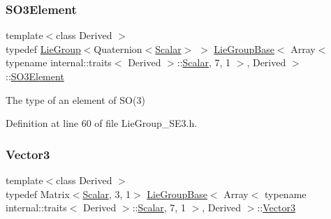 \subsubsection{\texorpdfstring{S\+O3\+Element}{SO3Element}}
{\footnotesize\ttfamily template$<$class Derived $>$ \\
typedef \hyperlink{class_lie_group}{Lie\+Group}$<$Quaternion$<$\hyperlink{class_lie_group_base_3_01_array_3_01typename_01internal_1_1traits_3_01_derived_01_4_1_1_scalar_0d6d4b5459662fc32c7117aee50362fb1_a831695c575380c9a1df32eff9fc4a8c6}{Scalar}$>$ $>$ \hyperlink{class_lie_group_base}{Lie\+Group\+Base}$<$ Array$<$ typename internal\+::traits$<$ Derived $>$\+::\hyperlink{class_lie_group_base_3_01_array_3_01typename_01internal_1_1traits_3_01_derived_01_4_1_1_scalar_0d6d4b5459662fc32c7117aee50362fb1_a831695c575380c9a1df32eff9fc4a8c6}{Scalar}, 7, 1 $>$, Derived $>$\+::\hyperlink{class_lie_group_base_3_01_array_3_01typename_01internal_1_1traits_3_01_derived_01_4_1_1_scalar_0d6d4b5459662fc32c7117aee50362fb1_a2594349e8f4329af620dff380a457890}{S\+O3\+Element}}

The type of an element of S\+O(3) 

Definition at line 60 of file Lie\+Group\+\_\+\+S\+E3.\+h.

\hypertarget{class_lie_group_base_3_01_array_3_01typename_01internal_1_1traits_3_01_derived_01_4_1_1_scalar_0d6d4b5459662fc32c7117aee50362fb1_acf35a22e3543ed4824de3c19c965961c}{}\label{class_lie_group_base_3_01_array_3_01typename_01internal_1_1traits_3_01_derived_01_4_1_1_scalar_0d6d4b5459662fc32c7117aee50362fb1_acf35a22e3543ed4824de3c19c965961c} 
\subsubsection{\texorpdfstring{Vector3}{Vector3}}
{\footnotesize\ttfamily template$<$class Derived $>$ \\
typedef Matrix$<$\hyperlink{class_lie_group_base_3_01_array_3_01typename_01internal_1_1traits_3_01_derived_01_4_1_1_scalar_0d6d4b5459662fc32c7117aee50362fb1_a831695c575380c9a1df32eff9fc4a8c6}{Scalar}, 3, 1$>$ \hyperlink{class_lie_group_base}{Lie\+Group\+Base}$<$ Array$<$ typename internal\+::traits$<$ Derived $>$\+::\hyperlink{class_lie_group_base_3_01_array_3_01typename_01internal_1_1traits_3_01_derived_01_4_1_1_scalar_0d6d4b5459662fc32c7117aee50362fb1_a831695c575380c9a1df32eff9fc4a8c6}{Scalar}, 7, 1 $>$, Derived $>$\+::\hyperlink{class_lie_group_base_3_01_array_3_01typename_01internal_1_1traits_3_01_derived_01_4_1_1_scalar_0d6d4b5459662fc32c7117aee50362fb1_acf35a22e3543ed4824de3c19c965961c}{Vector3}}


